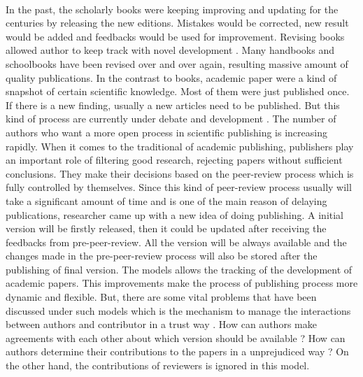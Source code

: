 \documentclass [12pt]{report}
\begin{document}
\paragraph{}In the past, the scholarly books were keeping improving and updating for the centuries by releasing the new editions. 
Mistakes would be corrected, new result would be added and feedbacks would be used for improvement. 
Revising books allowed author to keep track with novel development \cite{heller2014dynamic}. 
Many handbooks and schoolbooks have been revised over and over again, resulting massive amount of quality publications.
In the contrast to books, academic paper were a kind of snapshot of certain scientific knowledge. 
Most of them were just published once. If there is a new finding, usually a new articles need to be published. 
But this kind of process are currently under debate and development \cite{heller2014dynamic}. 
The number of authors who want a more open process in scientific publishing is increasing rapidly. 
When it comes to the traditional of academic publishing, 
publishers play an important role of filtering good research, rejecting papers 
without sufficient conclusions. 
They make their decisions based on the peer-review process which is fully controlled by themselves. 
Since this kind of peer-review process usually will take a significant amount of time and is one of the
main reason of delaying publications, researcher came up with a new idea of doing publishing. A initial version
will be firstly released, then it could be updated after receiving the feedbacks from pre-peer-review. 
All the version will be always available and the changes made in the pre-peer-review process will also be stored after the publishing of final version.
The models allows the tracking of the development of academic papers. 
This improvements make the process of publishing process more dynamic and flexible.
But, there are some vital problems that have been discussed under such models 
which is the mechanism to manage the interactions between authors and contributor in a trust way \cite{Khoe:1994:CML:2288694.2294265}.
How can authors make agreements with each other about which version should be available ?
How can authors determine their contributions to the papers in a unprejudiced way ? On the other hand,
the contributions of reviewers is ignored in this model.
\end{document}
